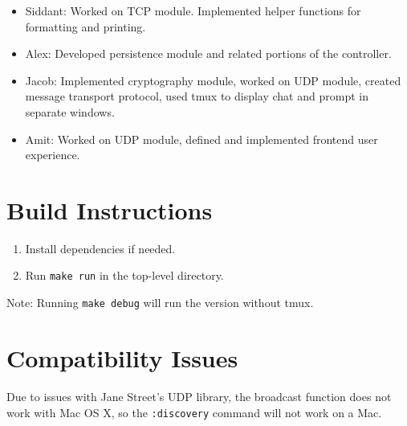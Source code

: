 \documentclass{scrartcl}
\begin{document}
\begin{itemize}

        \item Siddant: Worked on TCP module. Implemented helper functions for formatting and printing.\\

        \item Alex: Developed persistence module and related portions of the controller.\\

        \item Jacob: Implemented cryptography module, worked on UDP module, created message transport protocol, used tmux to display chat and prompt in separate windows. \\

        \item Amit: Worked on UDP module, defined and implemented frontend user experience. \\

\end{itemize}

\section{Build Instructions}

\begin{enumerate}
    \item Install dependencies if needed.
    \item Run \texttt{make run} in the top-level directory.
\end{enumerate}

Note: Running \texttt{make debug} will run the version without tmux.

\section{Compatibility Issues}

Due to issues with Jane Street's UDP library, the broadcast function does not work with Mac OS X, so the \texttt{:discovery} command will not work on a Mac.
\end{document}
